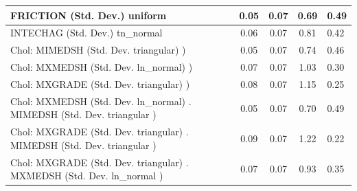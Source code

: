 \begin{table}
\begin{center}
\begin{tabular}{|l|l|c|c|c|l|}
			\hline
			FRICTION (Std. Dev.) uniform &  & 0.05 & 0.07 & 0.69 & 0.49 \\
			\hline
			INTECHAG (Std. Dev.) tn_normal &  & 0.06 & 0.07 & 0.81 & 0.42 \\
			\hline
			 Chol: MIMEDSH (Std. Dev. triangular) ) &  & 0.05 & 0.07 & 0.74 & 0.46 \\
			\hline
			 Chol: MXMEDSH (Std. Dev. ln_normal) ) &  & 0.07 & 0.07 & 1.03 & 0.30 \\
			\hline
			 Chol: MXGRADE (Std. Dev. triangular) ) &  & 0.08 & 0.07 & 1.15 & 0.25 \\
			\hline
			 Chol: MXMEDSH (Std. Dev. ln_normal) . MIMEDSH (Std. Dev.   triangular ) &  & 0.05 & 0.07 & 0.70 & 0.49 \\
			\hline
			 Chol: MXGRADE (Std. Dev. triangular) . MIMEDSH (Std. Dev.   triangular ) &  & 0.09 & 0.07 & 1.22 & 0.22 \\
			\hline
			 Chol: MXGRADE (Std. Dev. triangular) . MXMEDSH (Std. Dev.   ln_normal ) &  & 0.07 & 0.07 & 0.93 & 0.35 \\
			\hline
		\end{tabular}
	\end{center}
\end{table}